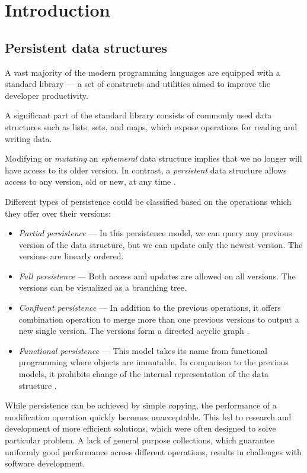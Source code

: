 \chapter{Introduction}

\section{Persistent data structures}

A vast majority of the modern programming languages are equipped with a standard library --- a set of constructs and utilities aimed to improve the developer productivity. 

A significant part of the standard library consists of commonly used data structures such as lists, sets, and maps, which expose operations for reading and writing data. 

Modifying or \emph{mutating} an \emph{ephemeral} data structure implies that we no longer will have access to its older version. In contrast, a \emph{persistent} data structure allows access to any version, old or new, at any time \cite{making-data-structures-persistent}. 

Different types of persistence could be classified based on the operations which they offer over their versions:
\begin{itemize}
    \item \textit{Partial persistence} --- In this persistence model, we can query any previous version of the data structure, but we can update only the newest version. The versions are linearly ordered. 
    \item \textit{Full persistence} --- Both access and updates are allowed on all versions. The versions can be visualized as a branching tree.
    \item \textit{Confluent persistence} --- In addition to the previous operations, it offers combination operation to merge more than one previous versions to output a new single version. The versions form a directed acyclic graph \cite{fully-persistent-lists-with-catenation}.  
    \item \textit{Functional persistence} --- This model takes its name from functional programming where objects are immutable. In comparison to the previous models, it prohibits change of the internal representation of the data structure \cite{purely-functional-data-structures}. 
\end{itemize}

While persistence can be achieved by simple copying, the performance of a modification operation quickly becomes unacceptable. This led to research and development of more efficient solutions, which were often designed to solve particular problem. A lack of general purpose collections, which guarantee uniformly good performance across different operations, results in challenges with software development. 

